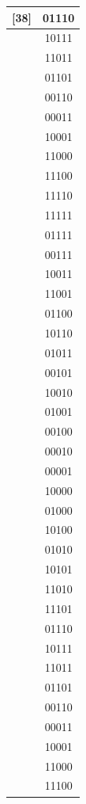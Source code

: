 \documentclass{article}
\begin{document}
\begin{tabular}{c|c}
  [38]	& 01110 \\ \hline
  [39]	& 10111 \\ \hline
  [40]	& 11011 \\ \hline
  [41]	& 01101 \\ \hline
  [42]	& 00110 \\ \hline
  [43]	& 00011 \\ \hline
  [44]	& 10001 \\ \hline
  [45]	& 11000 \\ \hline
  [46]	& 11100 \\ \hline
  [47]	& 11110 \\ \hline
  [48]	& 11111 \\ \hline
  [49]	& 01111 \\ \hline
  [50]	& 00111 \\ \hline
  [51]	& 10011 \\ \hline
  [52]	& 11001 \\ \hline
  [53]	& 01100 \\ \hline
  [54]	& 10110 \\ \hline
  [55]	& 01011 \\ \hline
  [56]	& 00101 \\ \hline
  [57]	& 10010 \\ \hline
  [58]	& 01001 \\ \hline
  [59]	& 00100 \\ \hline
  [60]	& 00010 \\ \hline
  [61]	& 00001 \\ \hline
  [62]	& 10000 \\ \hline
  [63]	& 01000 \\ \hline
  [64]	& 10100 \\ \hline
  [65]	& 01010 \\ \hline
  [66]	& 10101 \\ \hline
  [67]	& 11010 \\ \hline
  [68]	& 11101 \\ \hline
  [69]	& 01110 \\ \hline
  [70]	& 10111 \\ \hline
  [71]	& 11011 \\ \hline
  [72]	& 01101 \\ \hline
  [73]	& 00110 \\ \hline
  [74]	& 00011 \\ \hline
  [75]	& 10001 \\ \hline
  [76]	& 11000 \\ \hline
  [77]	& 11100 \\ \hline

\end{tabular}
\end{document}
